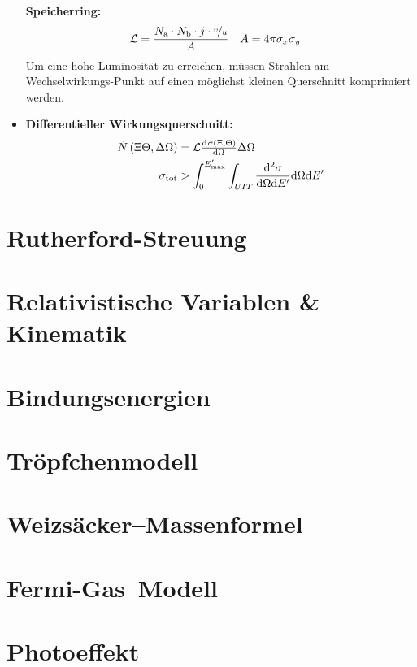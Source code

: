 \documentclass[BCOR=5mm,DIV=calc,listof=totoc,headings=big]{scrartcl}
\newcommand{\de}{\mathrm{d}}
\begin{document}
\begin{itemize}
  \textbf{Speicherring:}
  \begin{align*}
    \mathcal{L}&=\frac{N_{\mathrm{a}} \cdot N_{\mathrm{b}} \cdot j
      \cdot \nicefrac{v}{u}}{A} & A&=4\pi \sigma_{x} \sigma_{y}
  \end{align*}
  Um eine hohe Luminosität zu erreichen, müssen Strahlen am
  Wechselwirkungs-Punkt auf einen möglichst kleinen Querschnitt
  komprimiert werden.
\item \textbf{Differentieller Wirkungsquerschnitt:}
  \begin{align*}
    \dot{N}\del{\Xi \Theta, \Delta \Omega}&=\mathcal{L}
    \od{\sigma(\Xi, \Theta)}{\Omega}\Delta \Omega\\
    \sigma_{\text{tot}}&>\int_{0}^{E^{\prime}_{\text{max}}}\int_{UIT} \frac{\de
   ^{2}\sigma}{\de\Omega\de E^{\prime}}\de\Omega\de E^{\prime}
  \end{align*}
\end{itemize}

\section{Rutherford-Streuung}
\label{sec:rutherford-streuung}

\section{Relativistische Variablen \& Kinematik}
\label{sec:relat-vari-}

\section{Bindungsenergien}
\label{sec:bindungsenergien}

\section{Tröpfchenmodell}
\label{sec:tropfchenmodell}

\section{Weizsäcker--Massenformel}
\label{sec:weizs-mass}

\section{Fermi-Gas--Modell}
\label{sec:fermi-gas-modell}

\section{Photoeffekt}
\label{sec:photoeffekt}
\end{document}
